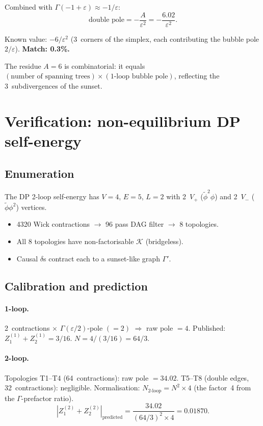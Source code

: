 \documentclass[11pt,a4paper]{article}
\theoremstyle{definition}
\newcommand{\phit}{\tilde\phi}
\newcommand{\K}{\mathcal{K}}
\begin{document}
Combined with $\Gamma(-1{+}\varepsilon) \approx -1/\varepsilon$:
\begin{equation}
\text{double pole} = -\frac{A}{\varepsilon^2}
= -\frac{6.02}{\varepsilon^2}.
\end{equation}

Known value: $-6/\varepsilon^2$ (3~corners of the simplex, each
contributing the bubble pole $2/\varepsilon$).
\textbf{Match: 0.3\%.}

The residue $A = 6$ is combinatorial: it equals
$(\text{number of spanning trees}) \times
(\text{1-loop bubble pole})$, reflecting the 3~subdivergences
of the sunset.


\section{Verification: non-equilibrium DP self-energy}
\label{sec:v_dp}

\subsection{Enumeration}

The DP 2-loop self-energy has $V = 4$, $E = 5$, $L = 2$ with
2~$V_+$ ($\phit^2\phi$) and 2~$V_-$ ($\phit\phi^2$) vertices.
\begin{itemize}
\item 4320 Wick contractions $\to$ 96 pass DAG filter $\to$ 8 topologies.
\item All 8 topologies have non-factorisable $\K$ (bridgeless).
\item Causal $\delta$s contract each to a sunset-like graph $\Gamma'$.
\end{itemize}

\subsection{Calibration and prediction}

\paragraph{1-loop.}
2~contractions $\times$ $\Gamma(\varepsilon/2)$-pole $({=}2)$
$\Rightarrow$ raw pole $= 4$.
Published: $Z_1^{(1)} + Z_2^{(1)} = 3/16$.
$N = 4/(3/16) = 64/3$.

\paragraph{2-loop.}
Topologies T1--T4 (64~contractions): raw pole $= 34.02$.
T5--T8 (double edges, 32~contractions): negligible.
Normalisation: $N_{\text{2-loop}} = N^2 \times 4$ (the factor~4
from the $\Gamma$-prefactor ratio).
\begin{equation}
\left|Z_1^{(2)} + Z_2^{(2)}\right|_{\text{predicted}} =
\frac{34.02}{(64/3)^2 \times 4} = 0.01870.
\end{equation}
\end{document}

